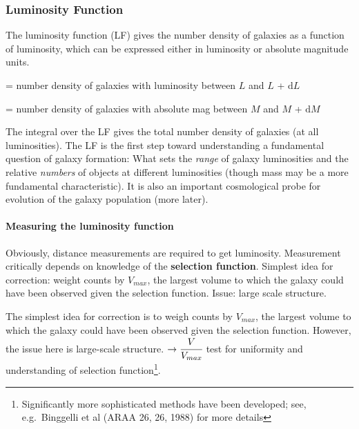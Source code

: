 \documentclass{article}
\begin{document}
\subsubsection{Luminosity Function}
The luminosity function (LF) gives the number density of galaxies as a
function of luminosity, which can be expressed either in luminosity or
absolute magnitude units.
\begin{description}[labelwidth=3em, labelindent=0.25in]
    \item [$\Phi(L)$] = number density of galaxies with
        luminosity between $L$ and $L$ + $\mathrm{d}L$
    \item [$\Phi(M)$] = number density of galaxies with absolute
        mag between $M$ and $M$ + $\mathrm{d}M$
\end{description}
The integral over the LF gives the total number density of galaxies (at all
luminosities). The LF is the first step toward understanding a fundamental
question of galaxy formation: What sets the \emph{range} of galaxy luminosities
and the relative \emph{numbers} of objects at different luminosities (though
mass may be a more fundamental characteristic). It is also an important
cosmological probe for evolution of the galaxy population (more later).

\paragraph{Measuring the luminosity function}
Obviously, distance measurements are required to get luminosity.
Measurement critically depends on knowledge of the \textbf{selection
function}.
Simplest idea for correction: weight counts by $V_{max}$, the largest
volume to which the galaxy could have been observed given the selection
function. Issue: large scale structure.

The simplest idea for correction is to weigh counts by $V_{max}$, the
largest volume to which the galaxy could have been observed given the
selection function. However, the issue here is large-scale structure.
$\rightarrow \cfrac{V}{V_{max}}$ test for uniformity and understanding
of selection function\footnote{Significantly more sophisticated
methods have been developed; see, e.g.\ Binggelli et al (ARAA 26, 26,
1988) for more details}.
\end{document}
